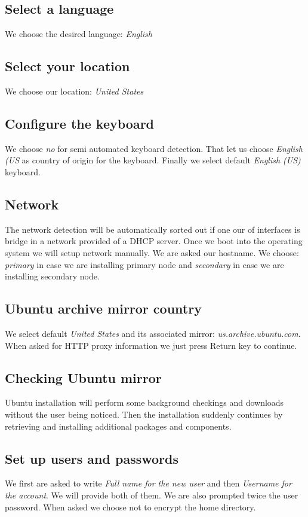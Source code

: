 \subsection {Select a language}
We choose the desired language: \textit{English}
\subsection {Select your location}
We choose our location: \textit{United States}
\subsection {Configure the keyboard}
We choose \textit{no} for semi automated keyboard detection. That let us choose \textit{English (US} as country of origin for the keyboard. Finally we select default \textit{English (US)} keyboard.
\subsection {Network}
The network detection will be automatically sorted out if one our of interfaces is bridge in a network provided of a DHCP server. Once we boot into the operating system we will setup network manually. We are asked our hostname. We choose: \textit{primary} in case we are installing primary node and \textit{secondary} in case we are installing secondary node.
\subsection {Ubuntu archive mirror country}
We select default \textit{United States} and its associated mirror: \textit{us.archive.ubuntu.com}. When asked for HTTP proxy information we just press Return key to continue.
\subsection {Checking Ubuntu mirror}
Ubuntu installation will perform some background checkings and downloads without the user being noticed. Then the installation suddenly continues by retrieving and installing additional packages and components.
\subsection {Set up users and passwords}
We first are asked to write \textit{Full name for the new user} and then \textit{Username for the account}. We will provide both of them. We are also prompted twice the user password. When asked we choose not to encrypt the home directory.
